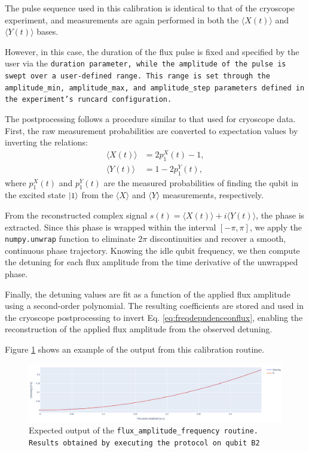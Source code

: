 The pulse sequence used in this calibration is identical to that of the cryoscope experiment, and measurements are again performed in both the $\langle X(t) \rangle$ and $\langle Y(t) \rangle$ bases. 

However, in this case, the duration of the flux pulse is fixed and specified by the user via the \tt{duration} parameter, while the amplitude of the pulse is swept over a user-defined range. 
This range is set through the \tt{amplitude\_min}, \tt{amplitude\_max}, and \tt{amplitude\_step} parameters defined in the experiment's runcard configuration.

The postprocessing follows a procedure similar to that used for cryoscope data. 
First, the raw measurement probabilities are converted to expectation values by inverting the relations:
\begin{align}
\langle X(t) \rangle &= 2p^X_1(t) - 1, \\
\langle Y(t) \rangle &= 1 - 2p^Y_1(t),
\end{align}
where $p^X_1(t)$ and $p^Y_1(t)$ are the measured probabilities of finding the qubit in the excited state $\ket{1}$ from the $\langle X \rangle$ and $\langle Y \rangle$ measurements, respectively.

From the reconstructed complex signal $s(t) = \langle X(t) \rangle + i\langle Y(t) \rangle$, the phase is extracted. 
Since this phase is wrapped within the interval $[-\pi, \pi]$, we apply the \texttt{numpy.unwrap} function to eliminate $2\pi$ discontinuities and recover a smooth, continuous phase trajectory. 
Knowing the idle qubit frequency, we then compute the detuning for each flux amplitude from the time derivative of the unwrapped phase.

Finally, the detuning values are fit as a function of the applied flux amplitude using a second-order polynomial.
The resulting coefficients are stored and used in the cryoscope postprocessing to invert Eq. \ref{eq:freqdepndenceonflux}, enabling the reconstruction of the applied flux amplitude from the observed detuning.

Figure \ref{fig:flux_amplitude_frequency} shows an example of the output from this calibration routine.

\begin{figure}[h!]
    \centering
    \includegraphics[width=\textwidth]{figures/png/flux_amp_freq.png}
    \caption{Expected output of the \tt{flux\_amplitude\_frequency} routine. Results obtained by executing the protocol on qubit \tt{B2}}
    \label{fig:flux_amplitude_frequency}
\end{figure}

